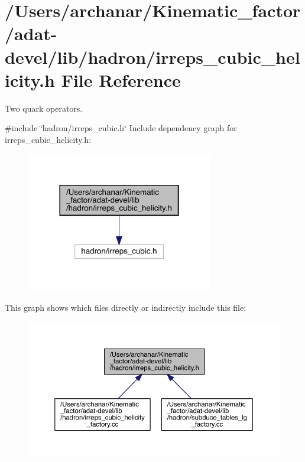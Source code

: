 \hypertarget{adat-devel_2lib_2hadron_2irreps__cubic__helicity_8h}{}\section{/\+Users/archanar/\+Kinematic\+\_\+factor/adat-\/devel/lib/hadron/irreps\+\_\+cubic\+\_\+helicity.h File Reference}
\label{adat-devel_2lib_2hadron_2irreps__cubic__helicity_8h}


Two quark operators.  


{\ttfamily \#include \char`\"{}hadron/irreps\+\_\+cubic.\+h\char`\"{}}\newline
Include dependency graph for irreps\+\_\+cubic\+\_\+helicity.\+h\+:
\nopagebreak
\begin{figure}[H]
\begin{center}
\leavevmode
\includegraphics[width=230pt]{d8/db2/adat-devel_2lib_2hadron_2irreps__cubic__helicity_8h__incl}
\end{center}
\end{figure}
This graph shows which files directly or indirectly include this file\+:
\nopagebreak
\begin{figure}[H]
\begin{center}
\leavevmode
\includegraphics[width=350pt]{dd/dba/adat-devel_2lib_2hadron_2irreps__cubic__helicity_8h__dep__incl}
\end{center}
\end{figure}

